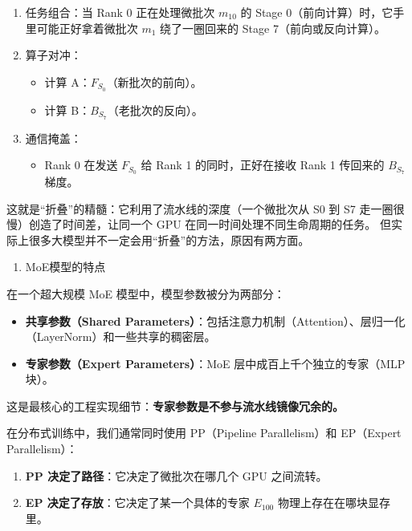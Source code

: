 \begin{enumerate}
\def\labelenumi{\arabic{enumi}.}
\tightlist
\item
  任务组合：当 Rank 0 正在处理微批次 \(m_{10}\) 的 Stage 0（前向计算）时，它手里可能正好拿着微批次 \(m_1\) 绕了一圈回来的 Stage 7（前向或反向计算）。
\item
{}
  算子对冲：

  \begin{itemize}
  \tightlist
  \item
    计算 A：\(F_{S_0}\)（新批次的前向）。
  \item
    计算 B：\(B_{S_7}\)（老批次的反向）。
  \end{itemize}
\item
{}
  通信掩盖：

  \begin{itemize}
  \tightlist
  \item
    Rank 0 在发送 \(F_{S_0}\) 给 Rank 1 的同时，正好在接收 Rank 1 传回来的 \(B_{S_7}\) 梯度。
  \end{itemize}
\end{enumerate}

这就是``折叠''的精髓：它利用了流水线的深度（一个微批次从 S0 到 S7 走一圈很慢）创造了时间差，让同一个 GPU 在同一时间处理不同生命周期的任务。
但实际上很多大模型并不一定会用``折叠''的方法，原因有两方面。

\begin{enumerate}
\def\labelenumi{\arabic{enumi}.}
\tightlist
\item
  MoE模型的特点
\end{enumerate}

在一个超大规模 MoE 模型中，模型参数被分为两部分：

\begin{itemize}
\tightlist
\item
  \textbf{共享参数（Shared Parameters）}：包括注意力机制（Attention）、层归一化（LayerNorm）和一些共享的稠密层。
\item
  \textbf{专家参数（Expert Parameters）}：MoE 层中成百上千个独立的专家（MLP 块）。
\end{itemize}

这是最核心的工程实现细节：\textbf{专家参数是不参与流水线镜像冗余的。}

在分布式训练中，我们通常同时使用 PP（Pipeline Parallelism）和 EP（Expert Parallelism）：

\begin{enumerate}
\def\labelenumi{\arabic{enumi}.}
\tightlist
\item
  \textbf{PP 决定了路径}：它决定了微批次在哪几个 GPU 之间流转。
\item
  \textbf{EP 决定了存放}：它决定了某一个具体的专家 \(E_{100}\) 物理上存在在哪块显存里。
\end{enumerate}

